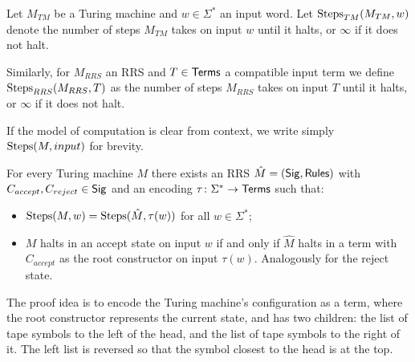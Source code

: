 \documentclass[11pt]{article}
\begin{document}
\begin{definition}
Let $M_{TM}$ be a Turing machine and $w \in \Sigma^*$ an input word. Let
$\mathrm{Steps}_{TM}(M_{TM}, w)$ denote the number of steps $M_{TM}$ takes on input $w$
until it halts, or $\infty$ if it does not halt.

Similarly, for $M_{RRS}$ an RRS and $T \in \mathsf{Terms}$ a compatible input term we define
$\mathrm{Steps}_{RRS}(M_{RRS}, T)$ as the number of steps $M_{RRS}$ takes on input $T$ until
it halts, or $\infty$ if it does not halt.

If the model of computation is clear from context, we write simply
$\mathrm{Steps}(M, input)$ for brevity.
\end{definition}

\begin{theorem}
For every Turing machine $M$ there exists an RRS $\hat M = (\mathsf{Sig}, \mathsf{Rules})$
with $C_{accept}, C_{reject} \in \mathsf{Sig}$ and an encoding $\tau \colon \Sigma^* \to \mathsf{Terms}$
such that:
\begin{itemize}
  \item $\mathrm{Steps}(M, w) = \mathrm{Steps}(\hat M, \tau(w))$ for all $w \in \Sigma^*$;
  \item $M$ halts in an accept state on input $w$ if and only if $\hat M$ halts
  in a term with $C_{accept}$ as the root constructor on input $\tau(w)$.
  Analogously for the reject state.
\end{itemize}
\end{theorem}

The proof idea is to encode the Turing machine's configuration as a term, where the
root constructor represents the current state, and has two children: the list of tape
symbols to the left of the head, and the list of tape symbols to the right of it. The
left list is reversed so that the symbol closest to the head is at the top.
\end{document}
